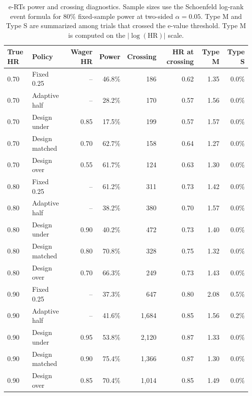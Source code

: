 \begin{table}[htbp]
\centering
\caption{e-RTs power and crossing diagnostics. Sample sizes use the Schoenfeld log-rank event formula for 80\% fixed-sample power at two-sided $\alpha=0.05$. Type M and Type S are summarized among trials that crossed the e-value threshold. Type M is computed on the $|\log(\mathrm{HR})|$ scale.}
\label{tab:erts_wager_policy_power}
\small
\begin{tabular}{@{}llrrrrrr@{}}
\toprule
True HR & Policy & Wager HR & Power & Crossing & HR at crossing & Type M & Type S \\
\midrule
0.70 & Fixed 0.25 & -- & 46.8\% & 186 & 0.62 & 1.35 & 0.0\% \\
0.70 & Adaptive half & -- & 28.2\% & 170 & 0.57 & 1.56 & 0.0\% \\
0.70 & Design under & 0.85 & 17.5\% & 199 & 0.57 & 1.57 & 0.0\% \\
0.70 & Design matched & 0.70 & 62.7\% & 158 & 0.64 & 1.27 & 0.0\% \\
0.70 & Design over & 0.55 & 61.7\% & 124 & 0.63 & 1.30 & 0.0\% \\
0.80 & Fixed 0.25 & -- & 61.2\% & 311 & 0.73 & 1.42 & 0.0\% \\
0.80 & Adaptive half & -- & 38.2\% & 380 & 0.70 & 1.57 & 0.0\% \\
0.80 & Design under & 0.90 & 40.2\% & 472 & 0.73 & 1.40 & 0.0\% \\
0.80 & Design matched & 0.80 & 70.8\% & 328 & 0.75 & 1.32 & 0.0\% \\
0.80 & Design over & 0.70 & 66.3\% & 249 & 0.73 & 1.43 & 0.0\% \\
0.90 & Fixed 0.25 & -- & 37.3\% & 647 & 0.80 & 2.08 & 0.5\% \\
0.90 & Adaptive half & -- & 41.6\% & 1{,}684 & 0.85 & 1.56 & 0.2\% \\
0.90 & Design under & 0.95 & 53.8\% & 2{,}120 & 0.87 & 1.33 & 0.0\% \\
0.90 & Design matched & 0.90 & 75.4\% & 1{,}366 & 0.87 & 1.30 & 0.0\% \\
0.90 & Design over & 0.85 & 70.4\% & 1{,}014 & 0.85 & 1.49 & 0.0\% \\
\bottomrule
\end{tabular}
\end{table}
